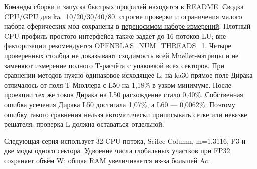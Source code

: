 \documentclass[
  russian,
  11pt,
  a4paper,
]{report}
\begin{document}
Команды сборки и запуска быстрых профилей находятся в
\href{README.md}{README}. Сводка CPU/GPU для ka=10/20/30/40/80, строгие
проверки и ограничения малого набора сферических мод сохранены в
\href{reference/performance_20261117/README.md}{переносимом наборе
измерений}. Плотный CPU-профиль простого интерфейса также задаёт до 16
потоков LU; вне факторизации рекомендуется OPENBLAS\_NUM\_THREADS=1.
Четыре проверенных столбца не доказывают сходимость всей Mueller-матрицы
и не заменяют измерение полного T-расчёта с упаковкой всех секторов. При
сравнении методов нужно одинаковое исходящее L: на ka30 прямое поле
Дирака отличалось от поля T-Мюллера с L50 на 1,18\% в узком минимуме.
После проекции тех же токов Дирака на L50 расхождение стало 0,40\%.
Собственная ошибка усечения Дирака L50 достигала 1,07\%, а L60 ---
0,0062\%. Поэтому ошибку такого сравнения нельзя автоматически
приписывать сетке или невязке решателя; проверка L должна оставаться
отдельной.

Следующая серия использует 32 CPU-потока, SciIce Column, m=1.3116, P3 и
две моды одного сектора. Удвоение числа глобальных участков при FP32
сохраняет объём W; общая RAM увеличивается из-за большей Ac.
\end{document}
